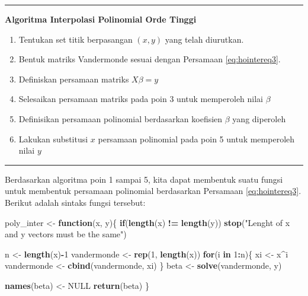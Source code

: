 \documentclass[
]{book}
\newenvironment{Shaded}{\begin{snugshade}}{\end{snugshade}}
\newcommand{\ConstantTok}[1]{\textcolor[rgb]{0.56,0.35,0.01}{#1}}
\newcommand{\ControlFlowTok}[1]{\textcolor[rgb]{0.13,0.29,0.53}{\textbf{#1}}}
\newcommand{\DecValTok}[1]{\textcolor[rgb]{0.00,0.00,0.81}{#1}}
\newcommand{\FunctionTok}[1]{\textcolor[rgb]{0.13,0.29,0.53}{\textbf{#1}}}
\newcommand{\NormalTok}[1]{#1}
\newcommand{\OtherTok}[1]{\textcolor[rgb]{0.56,0.35,0.01}{#1}}
\newcommand{\SpecialCharTok}[1]{\textcolor[rgb]{0.81,0.36,0.00}{\textbf{#1}}}
\newcommand{\StringTok}[1]{\textcolor[rgb]{0.31,0.60,0.02}{#1}}
\providecommand{\tightlist}{%
  \setlength{\itemsep}{0pt}\setlength{\parskip}{0pt}}
\theoremstyle{definition}
\theoremstyle{definition}
\theoremstyle{definition}
\theoremstyle{definition}
\theoremstyle{remark}
\begin{document}
\begin{center}\rule{0.5\linewidth}{0.5pt}\end{center}

\textbf{Algoritma Interpolasi Polinomial Orde Tinggi}

\begin{enumerate}
\def\labelenumi{\arabic{enumi}.}
\tightlist
\item
  Tentukan set titik berpasangan \(\left(x,y\right)\) yang telah diurutkan.
\item
  Bentuk matriks Vandermonde sesuai dengan Persamaan \eqref{eq:hointereq3}.
\item
  Definiskan persamaan matriks \(X\beta=y\)
\item
  Selesaikan persamaan matriks pada poin 3 untuk memperoleh nilai \(\beta\)
\item
  Definisikan persamaan polinomial berdasarkan koefisien \(\beta\) yang diperoleh
\item
  Lakukan substitusi \(x\) persamaan polinomial pada poin 5 untuk memperoleh nilai \(y\)
\end{enumerate}

\begin{center}\rule{0.5\linewidth}{0.5pt}\end{center}

Berdasarkan algoritma poin 1 sampai 5, kita dapat membentuk suatu fungsi untuk membentuk persamaan polinomial berdasarkan Persamaan \eqref{eq:hointereq3}. Berikut adalah sintaks fungsi tersebut:

\begin{Shaded}
\begin{Highlighting}[]
\NormalTok{poly\_inter }\OtherTok{\textless{}{-}} \ControlFlowTok{function}\NormalTok{(x, y)\{}
  \ControlFlowTok{if}\NormalTok{(}\FunctionTok{length}\NormalTok{(x) }\SpecialCharTok{!=} \FunctionTok{length}\NormalTok{(y))}
    \FunctionTok{stop}\NormalTok{(}\StringTok{"Lenght of x and y vectors must be the same"}\NormalTok{)}
  
\NormalTok{  n }\OtherTok{\textless{}{-}} \FunctionTok{length}\NormalTok{(x)}\SpecialCharTok{{-}}\DecValTok{1}
\NormalTok{  vandermonde }\OtherTok{\textless{}{-}} \FunctionTok{rep}\NormalTok{(}\DecValTok{1}\NormalTok{, }\FunctionTok{length}\NormalTok{(x))}
  \ControlFlowTok{for}\NormalTok{(i }\ControlFlowTok{in} \DecValTok{1}\SpecialCharTok{:}\NormalTok{n)\{}
\NormalTok{    xi }\OtherTok{\textless{}{-}}\NormalTok{ x}\SpecialCharTok{\^{}}\NormalTok{i}
\NormalTok{    vandermonde }\OtherTok{\textless{}{-}} \FunctionTok{cbind}\NormalTok{(vandermonde, xi)}
\NormalTok{  \}}
\NormalTok{  beta }\OtherTok{\textless{}{-}} \FunctionTok{solve}\NormalTok{(vandermonde, y)}
  
  \FunctionTok{names}\NormalTok{(beta) }\OtherTok{\textless{}{-}} \ConstantTok{NULL}
  \FunctionTok{return}\NormalTok{(beta)}
\NormalTok{\}}
\end{Highlighting}
\end{Shaded}
\end{document}
